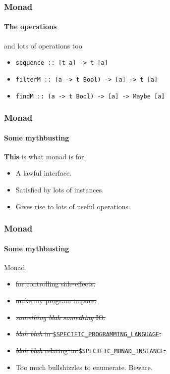 \begin{frame}[fragile]
\frametitle{Monad}
\framesubtitle{The operations}
\begin{block}{and lots of operations too}
\begin{itemize}
\item \lstinline{sequence :: [t a] -> t [a]}
\item \lstinline{filterM :: (a -> t Bool) -> [a] -> t [a]}
\item \lstinline{findM :: (a -> t Bool) -> [a] -> Maybe [a]}
\end{itemize}
\end{block}
\end{frame}

\begin{frame}[fragile]
\frametitle{Monad}
\framesubtitle{Some mythbusting}
\begin{center}
\textbf{This} is what monad is for.
\end{center}
\begin{center}
\begin{itemize}
\item A lawful interface.
\item Satisfied by lots of instances.
\item Gives rise to lots of useful operations.
\end{itemize}
\end{center}
\end{frame}

\begin{frame}[fragile]
\frametitle{Monad}
\framesubtitle{Some mythbusting}
\begin{block}{Monad}
\begin{itemize}
\item<1-> \sout{for controlling side-effects.}
\item<2-> \sout{make my program impure.}
\item<3-> \sout{\emph{something blah something} IO.}
\item<4-> \sout{\emph{blah blah} in \lstinline{$SPECIFIC_PROGRAMMING_LANGUAGE}.}
\item<5-> \sout{\emph{blah blah} relating to \lstinline{$SPECIFIC_MONAD_INSTANCE}.}
\item<6-> Too much bullshizzles to enumerate. Beware.
\end{itemize}
\end{block}
\end{frame}
